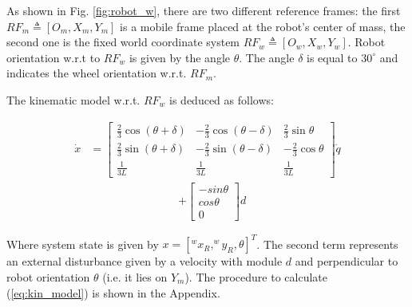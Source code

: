 As shown in Fig. \ref{fig:robot_w}, there are two different reference frames: the first $RF_m \triangleq [O_m, X_m, Y_m]$ is a mobile frame placed at the robot's center of mass, the second one is the fixed world coordinate system $RF_w \triangleq [O_w, X_w, Y_w]$. Robot orientation w.r.t to $RF_w$ is given by the angle $\theta$. The angle $\delta$ is equal to $30^\circ$ and indicates the wheel orientation w.r.t. $RF_m$.

The kinematic model w.r.t. $RF_w$ is deduced as follows:

\begin{align}
    \dot{x} &= \begin{bmatrix}
           \frac{2}{3}\cos{(\theta + \delta)} & -\frac{2}{3}\cos{(\theta - \delta)} &  \frac{2}{3}\sin{\theta}   \\
           \frac{2}{3}\sin{(\theta + \delta)} & -\frac{2}{3}\sin{(\theta - \delta)} &  -\frac{2}{3}\cos{\theta} \\
           \frac{1}{3L} & \frac{1}{3L} & \frac{1}{3L}
         \end{bmatrix} \dot{q} 
  \label{eq:kin_model}
\end{align}
\begin{align*}
    &+ \begin{bmatrix}
         -sin{\theta} \\
         cos{\theta} \\
         0
        \end{bmatrix} d
\end{align*}

Where system state is given by $x = [^w x_R, ^w y_R, \theta]^T$. The second term represents an external disturbance given by a velocity with module $d$ and perpendicular to robot orientation $\theta$ (i.e. it lies on $Y_m$). The procedure to calculate (\ref{eq:kin_model}) is shown in the Appendix.

